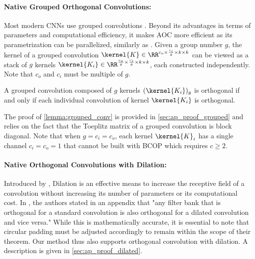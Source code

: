 \paragraph{Native Grouped Orthogonal Convolutions:}\label{sec:group}
    Most modern CNNs use grouped convolutions \cite{howard2017mobilenets, xie2017aggregated, liu2022convnet}. Beyond its advantages in terms of parameters and computational efficiency, it makes AOC more efficient as its parametrization can be parallelized, similarly as \cite{gorbunov2024group,liuparameter}.
    Given a group number $g$, the kernel of a grouped convolution $\kernel{K} \in \RR^{c_o \times \frac{c_i}{g} \times k \times k}$ can be viewed as a stack of $g$ kernels $\kernel{K_i} \in \RR^{\frac{c_o}{g} \times \frac{c_i}{g} \times k \times k}$, each constructed independently. Note that $c_o$ and $c_i$ must be multiple of $g$. 
    \begin{proposition}\label{lemma:grouped_conv}
        A grouped convolution composed of $g$ kernels $(\kernel{K_i})_g$ is orthogonal if and only if each individual convolution of kernel $\kernel{K_i}$ is orthogonal. %
    \end{proposition}
    
    The proof of \cref{lemma:grouped_conv} is provided in \cref{sec:ap_proof_grouped} and relies on the fact that the Toeplitz matrix of a grouped convolution is block diagonal.
    \noindent Note that when $g = c_i = c_o$, each kernel $\kernel{K}_i$ has a single channel $c_i=c_o=1$ that cannot be built with BCOP which requires $c\geq 2$.

\paragraph{Native Orthogonal Convolutions with Dilation:}

    Introduced by \cite{yu2015multi}, Dilation is an effective means to increase the receptive field of a convolution without increasing its number of parameters or its computational cost. In  \cite{su_scaling-up_2021}, the authors stated in an appendix that "any filter bank that is orthogonal for a standard convolution is also orthogonal for a dilated convolution and vice versa." While this is mathematically accurate, it is essential to note that circular padding must be adjusted accordingly to remain within the scope of their theorem. Our method thus also supports orthogonal convolution with dilation. A description is given in \cref{sec:ap_proof_dilated}.